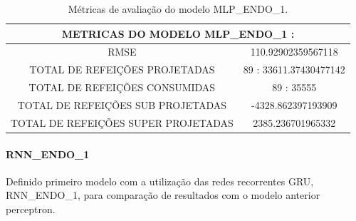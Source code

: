                 \begin{table}[!ht]
                \centering
                \begin{tabular}{|c|c|}
                \hline
                \multicolumn{2}{c}{METRICAS DO MODELO MLP\_ENDO\_1 :}\\ \hline
                RMSE &  110.92902359567118\\
                TOTAL DE REFEIÇÕES PROJETADAS & 89 : 33611.37430477142\\
                TOTAL DE REFEIÇÕES CONSUMIDAS & 89 : 35555\\
                TOTAL DE REFEIÇÕES SUB PROJETADAS & -4328.862397193909\\
                TOTAL DE REFEIÇÕES SUPER PROJETADAS & 2385.236701965332\\
                \hline
                \end{tabular} 
                \caption{Métricas de avaliação do modelo MLP\_ENDO\_1.}
                \label{table:case1_mlp_endo1_val_table}
                \end{table}
                 
              
              \paragraph{RNN\_ENDO\_1}
               Definido primeiro modelo com a utilização das redes recorrentes GRU, RNN\_ENDO\_1, para comparação de resultados com o modelo anterior perceptron.
                \begin{figure}[H]
                \end{figure}

